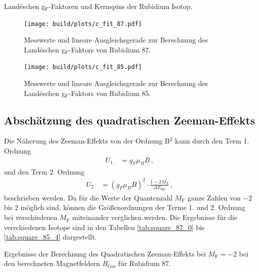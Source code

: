 \begin{table}[!h]
    \centering
    \caption{Landéschen g$_\text{F}$-Faktoren und Kernspins der Rubidium Isotop.}
    
    \label{tab:lande_faktor}
\end{table}

\begin{figure}[!h]
    \centering
    \texttt{[image: build/plots/c\_fit\_87.pdf]}
    \caption{Messwerte und lineare Ausgleichsgerade zur Berechnung des Landéschen g$_\text{F}$-Faktors von Rubidium 87.}
    \label{fig:fit_lande_87}
\end{figure}

\begin{figure}[!h]
    \centering
    \texttt{[image: build/plots/c\_fit\_85.pdf]}
    \caption{Messwerte und lineare Ausgleichsgerade zur Berechnung des Landéschen g$_\text{F}$-Faktors von Rubidium 85.}
    \label{fig:fit_lande_85}
\end{figure}

\FloatBarrier
\subsection{Abschätzung des quadratischen Zeeman-Effekts} %
\label{sub:quadratischer_zeeman_effekt}

Die Näherung des Zeeman-Effekts von der Ordnung B$^2$ kann durch den Term 1. Ordnung
\begin{align*}
    U_\text{1.} &= g_F \mu_B B \,,
\end{align*}
und den Term 2. Ordnung
\begin{align*}
    U_\text{2.} &= (g_F\mu_B B)^2 \cdot \frac{1 - 2M_F}{\Delta E_\text{Hy}} \,,
\end{align*}
beschrieben werden.
Da für die Werte der Quantenzahl $M_\text{F}$ ganze Zahlen von $-2$ bis $2$ möglich sind, können die Größenordnungen der Terme 1. und 2. Ordnung bei verschiedenen $M_\text{F}$ miteinander verglichen werden.
Die Ergebnisse für die verschiedenen Isotope sind in den Tabellen \ref{tab:square_87_0} bis \ref{tab:square_85_4} dargestellt.

\begin{table}[!h]
    \centering
    \caption{Ergebnisse der Berechnung des Quadratischen Zeeman-Effekts bei $M_\text{F} = -2$ bei den berechneten Magnetfeldern $B_\text{Ges}$ für Rubidium 87.}
    
    \label{tab:square_87_0}
\end{table}

